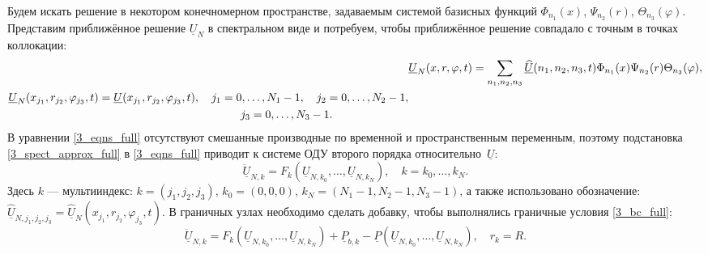 \documentclass[12pt, a4paper]{report}
\newcommand{\vect}[1]{\underline{#1}}
\begin{document}
Будем искать решение в некотором конечномерном пространстве, задаваемым системой базисных функций $\Phi_{n_1}(x)$, $\Psi_{n_2}(r)$, $\Theta_{n_3}(\varphi)$. 
Представим приближённое решение %
$\vect{U}_{N}$ в спектральном виде и потребуем, чтобы приближённое решение совпадало с точным в точках коллокации:
\begin{align}
\label{3_spect_approx_full}
&\vect{U}_{N}(x,r,\varphi,t) = \sum_{n_1,n_2,n_3} \vect{\widehat{U}}(n_1,n_2,n_3,t) \Phi_{n_1}(x) \Psi_{n_2}(r) \Theta_{n_3}(\varphi),\\
\label{3_pseudo_sp_approx_full}
\begin{split}
&\vect{U}_{N}(x_{j_1}, r_{j_2}, \varphi_{j_3}, t) = \vect{U}(x_{j_1}, r_{j_2}, \varphi_{j_3}, t), \quad j_1 = 0,\dots, N_1-1, \quad j_2 = 0,\dots, N_2-1,\\
&\hspace{72.5mm} j_3 = 0,\dots, N_3-1.
\end{split}
\end{align}
В уравнении \eqref{3_eqns_full} отсутствуют смешанные производные по временной и пространственным переменным, поэтому подстановка \eqref{3_spect_approx_full} в \eqref{3_eqns_full} приводит к системе ОДУ второго порядка относительно~$\vect{U}$:
\begin{equation}\label{3_ode_inner}
\vect{\ddot{U}}_{N,k} = F_{k}(\vect{U}_{N,k_0}, \dots, \vect{U}_{N,k_N}), \quad k = k_0, \dots, k_N.
\end{equation}
Здесь $k$ --- мультииндекс: $k = (j_1,j_2,j_3)$, $k_0=(0,0,0)$, $k_N = (N_1-1,N_2-1,N_3-1)$, а также использовано обозначение: $\vect{\widehat U}_{N,j_1,j_2,j_3} = \vect{\widehat U}_{N}(x_{j_1}, r_{j_2}, \varphi_{j_3}, t)$. В граничных узлах необходимо сделать добавку, чтобы выполнялись граничные условия \eqref{3_bc_full}:
\begin{equation}\label{3_ode_boundary}
\vect{\ddot{U}}_{N,k} = F_{k}(\vect{U}_{N,k_0}, \dots, \vect{U}_{N,k_N}) + \vect{P}_{b,k} - \vect{P}(\vect{U}_{N,k_0}, \dots, \vect{U}_{N,k_N}), \quad r_k = R.
\end{equation}
\end{document}
